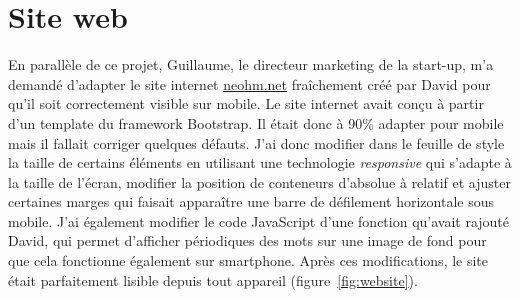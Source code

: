 \documentclass[a4paper, 12pt, sffamily]{report}
\begin{document}
\section{Site web}
En parallèle de ce projet, Guillaume, le directeur marketing de la start-up, m’a demandé d’adapter le site internet \url{neohm.net} fraîchement créé par David pour qu’il soit correctement visible sur mobile.
Le site internet avait conçu à partir d’un template du framework Bootstrap. Il était donc à 90\% adapter pour mobile mais il fallait corriger quelques défauts. J’ai donc modifier dans le feuille de style la taille de certains éléments en utilisant une technologie \emph{responsive} qui s’adapte à la taille de l’écran, modifier la position de conteneurs d’absolue à relatif et ajuster certaines marges qui faisait apparaître une barre de défilement horizontale sous mobile. J’ai également modifier le code JavaScript d’une fonction qu’avait rajouté David, qui permet d’afficher périodiques des mots sur une image de fond pour que cela fonctionne également sur smartphone. Après ces modifications, le site était parfaitement lisible depuis tout appareil (figure~\ref{fig:website}).
\end{document}

